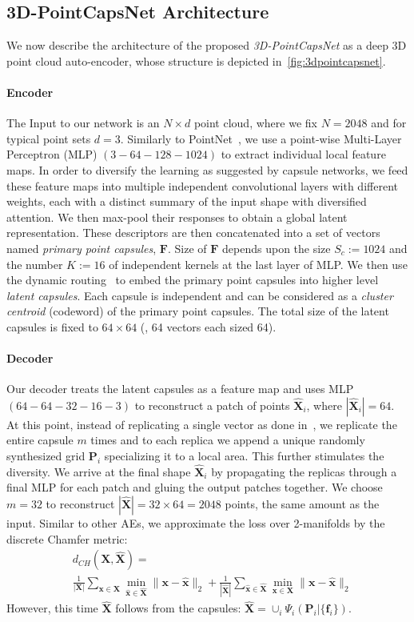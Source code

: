 \documentclass[10pt,twocolumn,letterpaper]{article}
\theoremstyle{break}
\newcommand{\x}{\mathbf{x}}
\newcommand{\X}{\mathbf{X}}
\newcommand{\Pm}{\mathbf{P}}
\newcommand{\f}{\mathbf{f}}
\newcommand{\F}{\mathbf{F}}
\begin{document}
 
\subsection{3D-PointCapsNet Architecture}
We now describe the architecture of the proposed \textit{3D-PointCapsNet} as a deep 3D point cloud auto-encoder, whose structure is depicted in~\cref{fig:3dpointcapsnet}. 

\vspace{-3mm}\paragraph{Encoder} The Input to our network is an $N \times d$ point cloud, where we fix $N=2048$ and for typical point sets $d=3$. Similarly to PointNet~\cite{qi2017pointnet}, we use a point-wise Multi-Layer Perceptron (MLP) $(3-64-128-1024)$ to extract individual local feature maps. In order to diversify the learning as suggested by capsule networks, we feed these feature maps into multiple independent convolutional layers with different weights, each with a distinct summary of the input shape with diversified attention. We then max-pool their responses to obtain a global latent representation. These descriptors are then concatenated into a set of vectors named \textit{primary point capsules}, $\F$. Size of $\F$ depends upon the size $S_c:=1024$ and the number $K:=16$ of independent kernels at the last layer of MLP. We then use the dynamic routing~\cite{sabour2017dynamic} to embed the primary point capsules into higher level \textit{latent capsules}. Each capsule is independent and can be considered as a \textit{cluster centroid} (codeword) of the primary point capsules. The total size of the latent capsules is fixed to $64\times 64$ (\ie, 64 vectors each sized 64).

\paragraph{Decoder}
Our decoder treats the latent capsules as a feature map and uses MLP$(64-64-32-16-3)$ to reconstruct a patch of points $\hat{\X}_i$, where $|\hat{\X}_i|=64$.
At this point, instead of replicating a single vector as done in~\cite{Yang_2018_CVPR, groueix2018}, we replicate the entire capsule $m$ times and to each replica we append a unique randomly synthesized grid $\Pm_i$ specializing it to a local area. This further stimulates the diversity. We arrive at the final shape $\hat{\X}_i$ by propagating the replicas through a final MLP for each patch and gluing the output patches together. We choose $m =32$ to reconstruct $|\hat{\X}|=32\times 64=2048$ points, the same amount as the input. 
Similar to other AEs, we approximate the loss over 2-manifolds by the discrete Chamfer metric:
\begin{align}
&d_{CH}(\X,\hat{\X}) =\\
&\frac{1}{|\X|}\sum\limits_{\x \in \X} \min_{\hat{\x}\in \hat{\X}} \| \x-\hat{\x} \|_2 + \frac{1}{|\hat{\X}|}\sum\limits_{\hat{\x} \in \hat{\X}} \min_{\x\in\X} \| \x-\hat{\x} \|_2\nonumber
\end{align}
However, this time $\hat{\X}$ follows from the capsules: $\hat{\X} = \cup_i \Psi_i(\Pm_i | \{\f_i\})$. 
\end{document}
